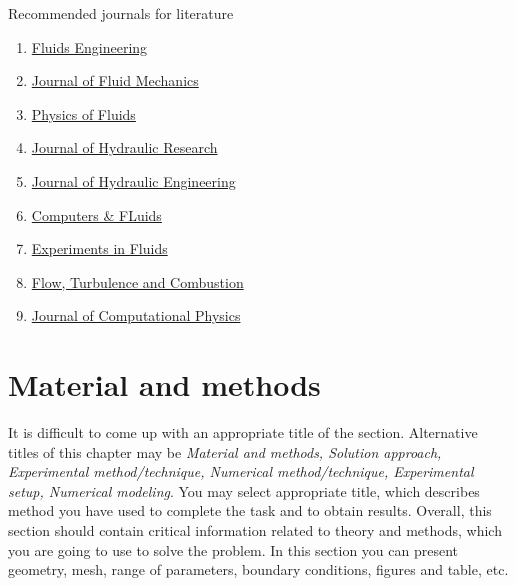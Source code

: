 \documentclass[subscriptcorrection,upint,varvw,mathalfa=cal=euler,barcolor=black,balance,hyphenate,french,pdf-a,nolists]{asmejour}
\begin{document}
Recommended journals for literature
\begin{enumerate}
    \item \href{https://asmedigitalcollection.asme.org/fluidsengineering}{Fluids Engineering}
    \item \href{https://www.cambridge.org/core/journals/journal-of-fluid-mechanics}{Journal of Fluid Mechanics}
    \item \href{https://aip.scitation.org/journal/phf}{Physics of Fluids}
    \item \href{https://www.tandfonline.com/toc/tjhr20/current}{Journal of Hydraulic Research}
    \item \href{https://ascelibrary.org/journal/jhend8}{Journal of Hydraulic Engineering}
    \item \href{https://www.sciencedirect.com/journal/computers-and-fluids}{Computers \& FLuids}
    \item \href{https://www.springer.com/journal/348}{Experiments in Fluids}
    \item \href{https://www.springer.com/journal/10494}{Flow, Turbulence and Combustion}
    \item \href{https://www.sciencedirect.com/journal/journal-of-computational-physics}{Journal of Computational Physics}
\end{enumerate}

\section{Material and methods}
\label{sec:2}
It is difficult to come up with an appropriate title of the section. Alternative titles of this chapter may be \textit{Material and methods, Solution approach, Experimental method/technique, Numerical method/technique, Experimental setup, Numerical modeling}. You may select appropriate title, which describes method you have used to complete the task and to obtain results. Overall, this section should contain critical information related to theory and methods, which you are going to use to solve the problem. In this section you can present geometry, mesh, range of parameters, boundary conditions, figures and table, etc.

\end{document}
